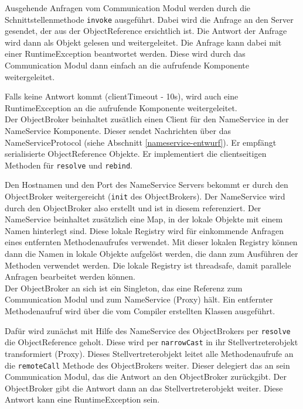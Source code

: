 \documentclass{article}
\begin{document}
Ausgehende Anfragen vom Communication Modul werden durch die Schnittstellenmethode \texttt{invoke} ausgeführt.
Dabei wird die Anfrage an den Server gesendet, der aus der ObjectReference ersichtlich ist. Die Antwort der Anfrage
wird dann als Objekt gelesen und weitergeleitet. Die Anfrage kann dabei mit einer RuntimeException beantwortet werden.
Diese wird durch das Communication Modul dann einfach an die aufrufende Komponente weitergeleitet.

Falls keine Antwort kommt (clientTimeout - 10s), wird auch eine RuntimeException an die aufrufende Komponente
weitergeleitet.\\

Der ObjectBroker beinhaltet zusätlich einen Client für den NameService in der NameService Komponente. Dieser sendet
Nachrichten über das NameServiceProtocol (siehe Abschnitt \ref{nameservice-entwurf}). Er empfängt serialisierte
ObjectReference Objekte. Er implementiert die clientseitigen Methoden für \texttt{resolve} und \texttt{rebind}.

Den Hostnamen und den Port des NameService Servers bekommt er durch den ObjectBroker weitergereicht
(\texttt{init} des ObjectBrokers). Der NameService wird durch den ObjectBroker also erstellt und ist in diesem
referenziert. Der NameService beinhaltet zusätzlich eine Map, in der lokale Objekte mit einem Namen hinterlegt sind.
Diese lokale Registry wird für einkommende Anfragen eines entfernten Methodenaufrufes verwendet. Mit dieser lokalen
Registry können dann die Namen in lokale Objekte aufgelöst werden, die dann zum Ausführen der Methoden verwendet werden.
Die lokale Registry ist threadsafe, damit parallele Anfragen bearbeitet werden können.\\

Der ObjectBroker an sich ist ein Singleton, das eine Referenz zum Communication Modul und zum NameService (Proxy) hält.
Ein entfernter Methodenaufruf wird über die vom Compiler erstellten Klassen ausgeführt.

Dafür wird zunächst mit Hilfe des NameService des ObjectBrokers per \texttt{resolve} die ObjectReference geholt. Diese
wird per \texttt{narrowCast} in ihr Stellvertreterobjekt transformiert (Proxy). Dieses Stellvertreterobjekt leitet alle
Methodenaufrufe an die \texttt{remoteCall} Methode des ObjectBrokers weiter. Dieser delegiert das an sein Communication
Modul, das die Antwort an den ObjectBroker zurückgibt. Der ObjectBroker gibt die Antwort dann an das
Stellvertreterobjekt weiter. Diese Antwort kann eine RuntimeException sein.
\end{document}
